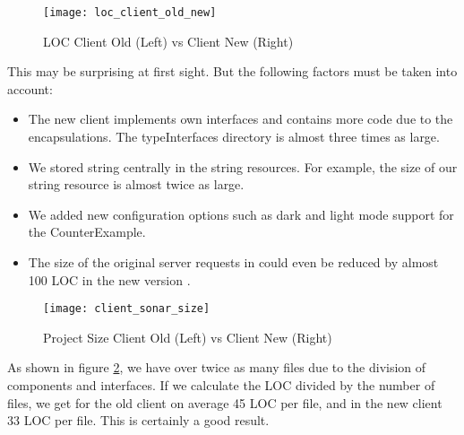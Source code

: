 \begin{figure}[H]
    \centering
    \texttt{[image: loc\_client\_old\_new]}
    \caption{LOC Client Old (Left) vs Client New (Right)}
    \label{fig:loc_client_old_new}
\end{figure}

This may be surprising at first sight. But the following factors must be taken into account:

\begin{itemize}
    \item The new client implements own interfaces and contains more code due to the encapsulations.
    The typeInterfaces directory is almost three times as large.
    \item We stored string centrally in the string resources.
    For example, the size of our string resource is almost twice as large.
    \item We added new configuration options such as dark and light mode support for the CounterExample.
    \item The size of the original server requests in 
    could even be reduced by almost 100 LOC in the new version .
\end{itemize}

\begin{figure}[H]
    \centering
    \texttt{[image: client\_sonar\_size]}
    \caption{Project Size Client Old (Left) vs Client New (Right)}
    \label{fig:client_sonar_size}
\end{figure}

As shown in figure \ref{fig:client_sonar_size},
we have over twice as many files due to the division of components and interfaces.
If we calculate the LOC divided by the number of files,
we get for the old client on average 45 LOC per file, and in the new client 33 LOC per file.
This is certainly a good result.
